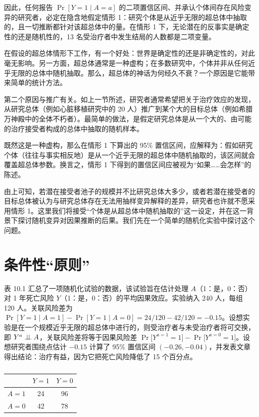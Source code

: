因此，任何报告 $\Pr[Y=1\mid A=a]$ 的二项置信区间、并承认个体间存在风险变异的研究者，必定在隐含地假定情形 1：研究个体是从近乎无限的超总体中抽取的，且一切推断都针对该超总体中的量。在情形 1 下，无论潜在的反事实是确定性的还是随机性的，13 名受治疗者中发生结局的人数都是二项变量。

在假设的超总体情形下工作，有一个好处：世界是确定性的还是非确定性的，对此毫无影响。另一方面，超总体通常是一种虚构；在多数研究中，个体并非从任何近乎无限的总体中随机抽取。那么，超总体的神话为何经久不衰？一个原因是它能带来简单的统计方法。

第二个原因与推广有关。如上一节所述，研究者通常希望把关于治疗效应的发现，从研究总体（例如心脏移植研究中的 20 人）推广到某个大的目标总体（例如希腊万神殿中的全体不朽者）。最简单的做法，是假定研究总体是从一个大的、由可能的治疗接受者构成的总体中抽取的随机样本。

既然这是一种虚构，那么在情形 1 下算出的 95\% 置信区间，应解释为：假如研究个体（往往与事实相反地）是从一个近乎无限的超总体中随机抽取的，该区间就会覆盖超总体参数。换言之，情形 1 下得到的置信区间应被视为“如果……会怎样”的陈述。

由上可知，若潜在接受者池子的规模并不比研究总体大多少，或者若潜在接受者的目标总体被认为与研究总体存在无法用抽样变异解释的差异，研究者也许就不愿采用情形 1。这里我们将接受“个体是从超总体中随机抽取的”这一设定，并在这一背景下探讨随机变异对因果推断的后果。我们先在一个简单的随机化实验中探讨这个问题。

\section{条件性“原则”}

表 10.1 汇总了一项随机化试验的数据，该试验旨在估计处理 $A$（1：是，0：否）对 1 年死亡风险 $Y$（1：是，0：否）的平均因果效应。实验纳入 240 人，每组 120 人。关联风险差为 $\Pr[Y=1\mid A=1]-\Pr[Y=1\mid A=0]=24/120-42/120=-0.15$。设想实验是在一个规模近乎无限的超总体中进行的，则受治疗者与未受治疗者将可交换，即 $Y^a\perp\!\!\!\perp A$，关联风险差将等于因果风险差 $\Pr\bigl[Y^{a=1}=1\bigr]-\Pr\bigl[Y^{a=0}=1\bigr]$。设想研究者围绕点估计 $-0.15$ 计算了 95\% 置信区间 $(-0.26,-0.04)$，并发表文章得出结论：治疗有益，因为它把死亡风险降低了 15 个百分点。

\begin{table}[htbp]
\centering
\caption{}
\label{tab:10.1}
\small
\begin{tabular}{lcc}
\toprule
& $Y=1$ & $Y=0$\\
\midrule
$A=1$ & 24 & 96\\
$A=0$ & 42 & 78\\
\bottomrule
\end{tabular}
\end{table}

